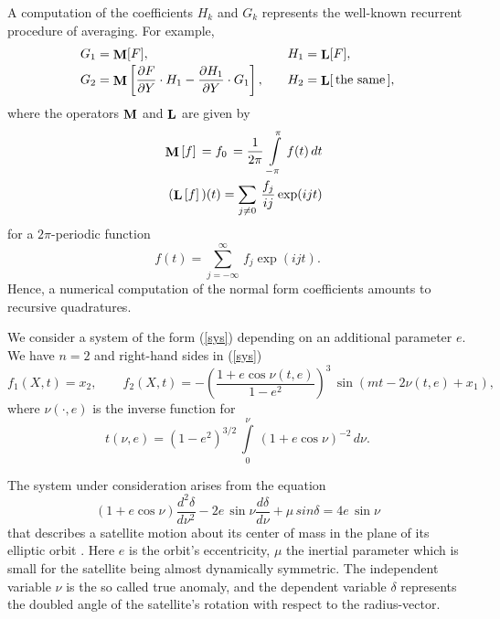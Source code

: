 A computation of the coefficients $H_k$ and $G_k$
represents the well-known recurrent procedure of averaging.
For example,
$$%
\begin{array}{ll}
G_1=\oM[F],& H_1=\oL[F],\\[0.5ex]
\dst G_2=\oM\left[\frac{\partial F}{\partial Y}\cdot H_1 -
            \frac{\partial H_1}{\partial Y}\cdot G_1\right],\quad
&\dst H_2=\oL[\,\mbox{the same}\,],
\end{array}
$$%
where the operators $\mathop{\bf M}\nolimits$ and $\mathop{\bf L}\nolimits$ are given by
\begin{eqnarray}
\label{oM}
&& \mathop{\bf M}\nolimits\,[f]\,= f_0\,=\frac{1}{2\pi}\,\int\limits_{-\pi}^{\pi}\,f(t)\,dt\\
\label{oL}
&& (\mathop{\bf L}\nolimits\,[f]\,)(t)=\sum\limits_{j\neq 0}\, \frac{f_j}{ij}\exp(ijt)
\end{eqnarray}
for a $2\pi$-periodic function
$$
f(t)=\sum\limits_{j=-\infty}^{\infty}\, f_j\exp(ijt).
$$
Hence, a numerical computation of the normal form coefficients
amounts to recursive quadratures.

\bigskip
{}
We consider a system of the form (\ref{sys}) depending
on an additional parameter $e$. We have $n=2$ and
right-hand sides in (\ref{sys})
\begin{equation}
\label{rhs}
f_1(X,t)=x_2,\qquad
f_2(X,t)=-\left(\frac{1+e\cos\nu(t,e)}{1-e^2}\right)^3\,
\sin(mt-2\nu(t,e)+x_1),
\end{equation}
where $\nu(\cdot,e)$ is the inverse function
for
$$%
t(\nu,e)=(1-e^2)^{3/2}\,\int\limits_{0}^{\nu}\,(1
+e\cos\nu)^{-2}\,d\nu.
$$%

The system under consideration arises from
the equation
\begin{equation}
\label{sput}
(1+e\cos\nu)\frac{d^2\delta}{d\nu^2}-2e\,\sin\nu\frac{d\delta
}{d\nu} + \mu\,sin\delta=4e\,\sin\nu
\end{equation}
that describes
a satellite motion about its center of mass in the
plane of its elliptic orbit \cite{bel}.
Here  $e$ is the orbit's
eccentricity, $\mu$ the inertial parameter
which is small for the satellite being
almost dynamically symmetric. The independent
variable $\nu$ is the so called true anomaly,
and the dependent variable $\delta$
represents the doubled angle of the satellite's
rotation with respect to the radius-vector.

